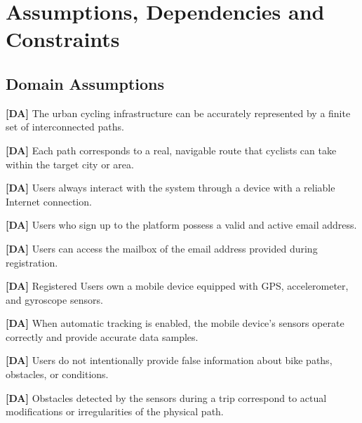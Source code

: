 





\section{Assumptions, Dependencies and Constraints}
\label{sec:assumptions_dependencies_constraints}%

\subsection{Domain Assumptions}
\label{subsec:domain_assumptions}%

\setcounter{da}{1}
\newcommand{\cda}{\theda{}}
    \textbf{[DA\cda]} The urban cycling infrastructure can be accurately represented by a finite set of interconnected paths.


    \textbf{[DA\cda]} Each path corresponds to a real, navigable route that cyclists can take within the target city or area.


    \textbf{[DA\cda]} Users always interact with the system through a device with a reliable Internet connection.


    \textbf{[DA\cda]} Users who sign up to the platform possess a valid and active email address.


    \textbf{[DA\cda]}  Users can access the mailbox of the email address provided during registration.


    \textbf{[DA\cda]} Registered Users own a mobile device equipped with GPS, accelerometer, and gyroscope sensors.


    \textbf{[DA\cda]} When automatic tracking is enabled, the mobile device’s sensors operate correctly and provide accurate data samples.


    \textbf{[DA\cda]} Users do not intentionally provide false information about bike paths, obstacles, or conditions.


    \textbf{[DA\cda]} Obstacles detected by the sensors during a trip correspond to actual modifications or irregularities of the physical path. %


